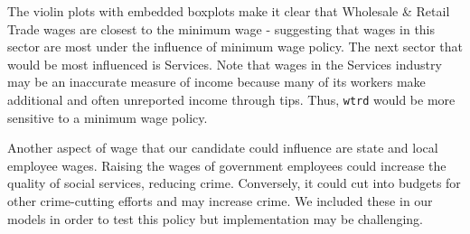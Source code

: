 \documentclass[]{article}
\newenvironment{Shaded}{\begin{snugshade}}{\end{snugshade}}
\newcommand{\CommentTok}[1]{\textcolor[rgb]{0.56,0.35,0.01}{\textit{#1}}}
\newcommand{\DataTypeTok}[1]{\textcolor[rgb]{0.13,0.29,0.53}{#1}}
\newcommand{\KeywordTok}[1]{\textcolor[rgb]{0.13,0.29,0.53}{\textbf{#1}}}
\newcommand{\NormalTok}[1]{#1}
\newcommand{\OperatorTok}[1]{\textcolor[rgb]{0.81,0.36,0.00}{\textbf{#1}}}
\newcommand{\StringTok}[1]{\textcolor[rgb]{0.31,0.60,0.02}{#1}}
\begin{document}
The violin plots with embedded boxplots make it clear that Wholesale \&
Retail Trade wages are closest to the minimum wage - suggesting that
wages in this sector are most under the influence of minimum wage
policy. The next sector that would be most influenced is Services. Note
that wages in the Services industry may be an inaccurate measure of
income because many of its workers make additional and often unreported
income through tips. Thus, \texttt{wtrd} would be more sensitive to a
minimum wage policy.

Another aspect of wage that our candidate could influence are state and
local employee wages. Raising the wages of government employees could
increase the quality of social services, reducing crime. Conversely, it
could cut into budgets for other crime-cutting efforts and may increase
crime. We included these in our models in order to test this policy but
implementation may be challenging.

\begin{Shaded}
\end{Shaded}
\end{document}
